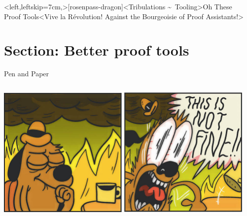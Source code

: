 \interlude*<left,leftskip=7cm,>[rosenpass-dragon]<Tribulations \textasciitilde\ Tooling>{Oh These\\Proof Tools}<Vive la Révolution! Against the Bourgeoisie of Proof Assistants!>
\section{Section: Better proof tools}

\begin{frame}[T]{Pen and Paper}
  \begin{columns}[fullwidth,t]
    \begin{column}{.29\linewidth}
      \par\nointerlineskip
      \includegraphics[width=\linewidth]{graphics/this-is-not-fine-crop.jpg}%
    \end{column}
    \hfill
    \begin{column}{.68\linewidth}
      \small


\end{column}
\end{columns}
\end{frame}
